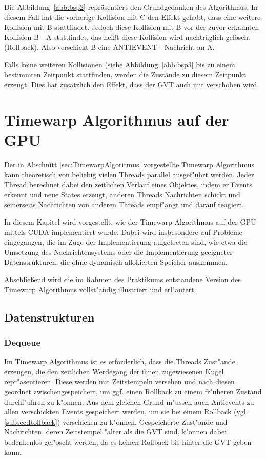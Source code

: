 \documentclass[a4paper, 10pt, openright, parskip, chapterprefix]{scrreprt}
\begin{document}
Die Abbildung~\ref{abb:bsp2} repräsentiert den Grundgedanken des Algorithmus. In diesem Fall hat die vorherige Kollision mit C den Effekt gehabt, dass eine weitere Kollision mit B stattfindet. Jedoch diese Kollision mit B vor der zuvor erkannten Kollision B - A stattfindet, das heißt diese Kollision wird nachträglich gelöscht (Rollback). Also verschickt B eine ANTIEVENT - Nachricht an A. 


Falls keine weiteren Kollisionen (siehe Abbildung~\ref{abb:bsp3} bis zu einem bestimmten Zeitpunkt stattfinden, werden die Zustände zu diesem Zeitpunkt erzeugt. Dies hat zusätzlich den Effekt, dass der GVT auch mit verschoben wird.

\chapter{Timewarp Algorithmus auf der GPU}
Der in Abschnitt \ref{sec:TimewarpAlgoritmus} vorgestellte Timewarp Algorithmus kann theoretisch von beliebig vielen Threads
parallel ausgef"uhrt werden. Jeder Thread berechnet dabei den zeitlichen Verlauf eines Objektes, indem er Events erkennt
und neue States erzeugt, anderen Threads Nachrichten schickt und seinerseits Nachrichten von anderen Threads empf"angt
und darauf reagiert. 

In diesem Kapitel wird vorgestellt, wie der Timewarp Algorithmus auf der GPU mittels CUDA implementiert wurde. Dabei wird
insbesondere auf Probleme eingegangen, die im Zuge der Implementierung aufgetreten sind, wie etwa die Umsetzung des
Nachrichtensystems oder die Implementierung geeigneter Datenstrukturen, die ohne dynamisch allokierten Speicher
auskommen.

Abschlie\ss end wird die im Rahmen des Praktikums entstandene Version des Timewarp Algorithmus vollst"andig illustriert
und erl"autert.

\section{Datenstrukturen}
\subsection{Dequeue}
Im Timewarp Algorithmus ist es erforderlich, dass die Threads Zust"ande erzeugen, die den zeitlichen Werdegang der ihnen zugewiesenen
Kugel repr"asentieren. Diese werden mit Zeitstempeln versehen und nach diesen geordnet zwischengespeichert, um ggf. einen Rollback zu einem
fr"uheren Zustand durchf"uhren zu k"onnen. Aus dem gleichen Grund m"ussen auch Antievents zu allen verschickten Events gespeichert
werden, um sie bei einem Rollback (vgl. \ref{subsec:Rollback}) verschicken zu k"onnen.
Gespeicherte Zust"ande und Nachrichten, deren Zeitstempel "alter als die GVT sind, k"onnen dabei bedenkenlos gel"oscht
werden, da es keinen Rollback bis hinter die GVT geben kann.
\end{document}
